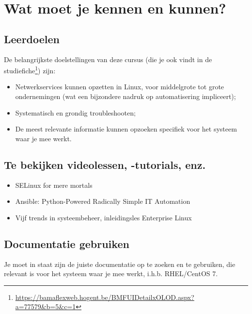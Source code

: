 \section{Wat moet je kennen en kunnen?}
\label{wat-moet-je-kennen-en-kunnen}

\subsection{Leerdoelen}
\label{leerdoelen}

De belangrijkste doelstellingen van deze cursus (die je ook vindt in de studiefiche\footnote{\url{https://bamaflexweb.hogent.be/BMFUIDetailxOLOD.aspx?a=77579&b=5&c=1}}) zijn:

\begin{itemize}
\item Netwerkservices kunnen opzetten in Linux, voor middelgrote tot grote ondernemingen (wat een bijzondere nadruk op automatisering impliceert);
\item Systematisch en grondig troubleshooten;
\item De meest relevante informatie kunnen opzoeken specifiek voor het systeem waar je mee werkt.
\end{itemize}

\subsection{Te bekijken videolessen, -tutorials, enz.}
\label{te-bekijken-videolessen--tutorials-enz.}


\begin{itemize}
  \item SELinux for mere mortals~\autocite{Cameron2012}
  \item Ansible: Python-Powered Radically Simple IT Automation~\autocite{DeHaan2014}
  \item Vijf trends in systeembeheer, inleidingsles Enterprise Linux~\autocite{VanVreckem2013}
\end{itemize}

\subsection{Documentatie gebruiken}
\label{documentatie-gebruiken}

Je moet in staat zijn de juiste documentatie op te zoeken en te gebruiken, die relevant is voor het systeem waar je mee werkt, i.h.b. RHEL/CentOS 7.

